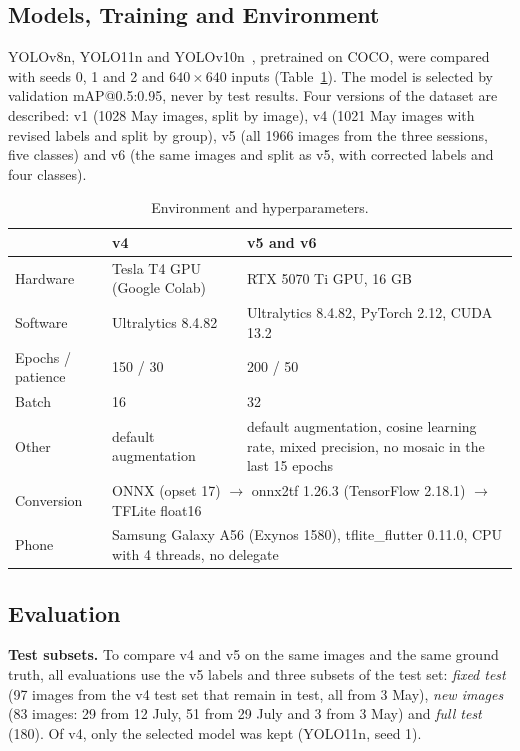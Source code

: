 \documentclass[sensors,article,submit,pdftex,moreauthors]{Definitions/mdpi}
\begin{document}
\subsection{\color{blue} Models, Training and Environment}

{\color{blue} YOLOv8n, YOLO11n and YOLOv10n~\cite{Jocher2023,Jocher2024,Wang2024v10}, pretrained on COCO, were compared with seeds 0, 1 and 2 and $640\times640$ inputs (Table~\ref{tab:entorno}).} {\color{blue} The model is selected by validation mAP@0.5:0.95, never by test results.} {\color{blue} Four versions of the dataset are described: v1 (1028 May images, split by image), v4 (1021 May images with revised labels and split by group), v5 (all 1966 images from the three sessions, five classes) and v6 (the same images and split as v5, with corrected labels and four classes).}

\begin{table}[H]\color{blue}
\caption{Environment and hyperparameters.\label{tab:entorno}}
\begin{tabularx}{\textwidth}{lXX}
\toprule
& \textbf{v4} & \textbf{v5 and v6}\\
\midrule
Hardware & Tesla T4 GPU (Google Colab) & RTX 5070 Ti GPU, 16 GB\\
Software & Ultralytics 8.4.82 & Ultralytics 8.4.82, PyTorch 2.12, CUDA 13.2\\
Epochs / patience & 150 / 30 & 200 / 50\\
Batch & 16 & 32\\
Other & default augmentation & default augmentation, cosine learning rate, mixed precision, no mosaic in the last 15 epochs\\
\midrule
Conversion & \multicolumn{2}{p{0.72\textwidth}}{ONNX (opset 17) $\rightarrow$ onnx2tf 1.26.3 (TensorFlow 2.18.1) $\rightarrow$ TFLite float16}\\
Phone & \multicolumn{2}{p{0.72\textwidth}}{Samsung Galaxy A56 (Exynos 1580), tflite\_flutter 0.11.0, CPU with 4 threads, no delegate}\\
\bottomrule
\end{tabularx}
\end{table}

\subsection{\color{blue} Evaluation}

{\color{blue} \textbf{Test subsets.} To compare v4 and v5 on the same images and the same ground truth, all evaluations use the v5 labels and three subsets of the test set:} {\color{blue} \emph{fixed test} (97 images from the v4 test set that remain in test, all from 3 May), \emph{new images} (83 images:} {\color{blue} 29 from 12 July, 51 from 29 July and 3 from 3 May) and \emph{full test} (180).} {\color{blue} Of v4, only the selected model was kept (YOLO11n, seed 1).}
\end{document}
